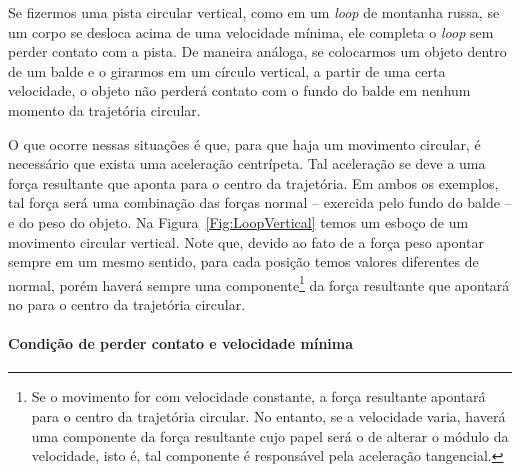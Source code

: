 Se fizermos uma pista circular vertical, como em um \emph{loop} de montanha russa, se um corpo se desloca acima de uma velocidade mínima, ele completa o \emph{loop} sem perder contato com a pista. De maneira análoga, se colocarmos um objeto dentro de um balde e o girarmos em um círculo vertical, a partir de uma certa velocidade, o objeto não perderá contato com o fundo do balde em nenhum momento da trajetória circular.

O que ocorre nessas situações é que, para que haja um movimento circular, é necessário que exista uma aceleração centrípeta. Tal aceleração se deve a uma força resultante que aponta para o centro da trajetória. Em ambos os exemplos, tal força será uma combinação das forças normal -- exercida pelo fundo do balde -- e do peso do objeto. Na Figura~\ref{Fig:LoopVertical} temos um esboço de um movimento circular vertical. Note que, devido ao fato de a força peso apontar sempre em um mesmo sentido, para cada posição temos valores diferentes de normal, porém haverá sempre uma componente\footnote[][-2cm]{Se o movimento for com velocidade constante, a força resultante apontará para o centro da trajetória circular. No entanto, se a velocidade varia, haverá uma componente da força resultante cujo papel será o de alterar o módulo da velocidade, isto é, tal componente é responsável pela aceleração tangencial.} da força resultante que apontará no para o centro da trajetória circular.

\paragraph{Condição de perder contato e velocidade mínima}

